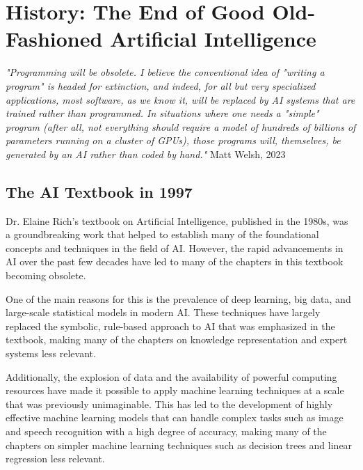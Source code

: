 \setchapterpreamble[u]{\margintoc}
\chapter{History: The End of Good Old-Fashioned Artificial Intelligence}

\textit{"Programming will be obsolete. I believe the conventional idea of "writing a program" is headed for extinction, and indeed, for all but very specialized applications, most software, as we know it, will be replaced by AI systems that are trained rather than programmed. In situations where one needs a "simple" program (after all, not everything should require a model of hundreds of billions of parameters running on a cluster of GPUs), those programs will, themselves, be generated by an AI rather than coded by hand."} Matt Welsh, 2023 \cite{welsh_2023}

\section{The AI Textbook in 1997}

Dr. Elaine Rich's textbook on Artificial Intelligence, published in the 1980s, was a groundbreaking work that helped to establish many of the foundational concepts and techniques in the field of AI. However, the rapid advancements in AI over the past few decades have led to many of the chapters in this textbook becoming obsolete.

One of the main reasons for this is the prevalence of deep learning, big data, and large-scale statistical models in modern AI. These techniques have largely replaced the symbolic, rule-based approach to AI that was emphasized in the textbook, making many of the chapters on knowledge representation and expert systems less relevant.

Additionally, the explosion of data and the availability of powerful computing resources have made it possible to apply machine learning techniques at a scale that was previously unimaginable. This has led to the development of highly effective machine learning models that can handle complex tasks such as image and speech recognition with a high degree of accuracy, making many of the chapters on simpler machine learning techniques such as decision trees and linear regression less relevant.  


